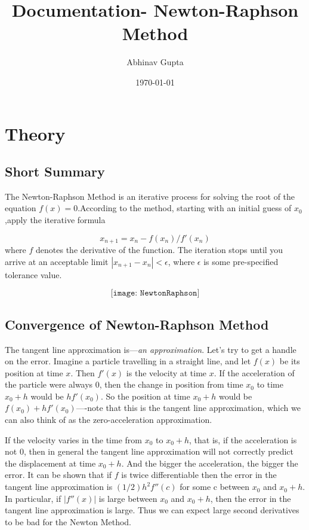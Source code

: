\documentclass{article}
\title{Documentation- \textbf{Newton-Raphson Method}}
\author{Abhinav Gupta}
\date{\today}
\begin{document}
 \tableofcontents
\maketitle
 
\section{Theory}
\subsection{Short Summary}
 
The Newton-Raphson Method is an iterative process for solving the root of the equation \(f(x)=0\).According to the method, starting with an initial guess of \(x_0\) ,apply the iterative formula

\[x_{n+1}=x_n-f(x_n)/f'(x_n)\]
where \(f\) denotes the derivative of the function. The iteration stops until you arrive at an acceptable limit \(|x_{n+1}- x_n|<\epsilon\), where \(\epsilon\) is some pre-specified tolerance value.

\[\texttt{[image: NewtonRaphson]}\]
 
\subsection{Convergence of Newton-Raphson Method}
 
The tangent line approximation is—\textit{an approximation}. Let’s try to get
a handle on the error. Imagine a particle travelling in a straight line, and
let \(f(x)\) be its position at time \(x\). Then \(f'(x)\) is the velocity at time \(x\). If the acceleration of the particle were always 0, then the change in position from time \(x_0\) to time \(x_0+h\) would be \(hf'(x_0)\). So the position at time \(x_0+h\) would be \(f(x_0)+hf'(x_0)\)—-note that this is the tangent line approximation, which we can also think of as the zero-acceleration approximation.
\vspace{5mm}

 If the velocity varies in the time from \(x_0\) to \(x_0 + h\), that is, if the acceleration is not 0, then in general the tangent line approximation will not
correctly predict the displacement at time \(x_0 + h\). And the bigger the acceleration, the bigger the error. It can be shown that if \(f\) is twice differentiable then the error in the tangent line approximation is \((1/2)h^2f''(c)\) for some c between \(x_0\) and \(x_0 + h\). In particular, if \(|f''(x)|\) is large between \(x_0\) and \(x_0 + h\), then the error in the tangent line approximation is large. Thus we can expect large second derivatives to be bad for the Newton Method.
\vspace{5mm}
\end{document}
